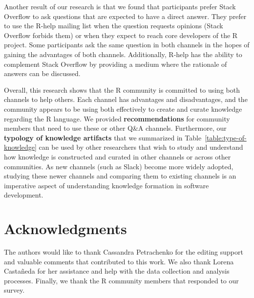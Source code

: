\documentclass[smallextended]{svjour3}       %
\newcommand{\SO}{Stack Overflow\xspace}
\newcommand{\RH}{R-help\xspace}
\begin{document}
Another result of our research is that we found that participants prefer \SO to ask questions that are expected to have a direct answer. They prefer to use the \RH mailing list when the
question requests opinions (\SO forbids them) or when they expect to reach core developers of the R project. Some participants ask the same question in both
channels in the hopes of gaining the advantages of both channels. Additionally, \RH has the ability to complement \SO by providing a medium where the rationale
of answers can be discussed.

Overall, this research shows that the R community is committed to using both channels to help others. Each channel has advantages and disadvantages, and the
community appears to be using both effectively to create and curate knowledge regarding the R language.  We provided \textbf{recommendations} for community members that need to use these or other Q\&A channels.  Furthermore, our \textbf{typology of knowledge artifacts} that we summarized in Table~\ref{table:type-of-knowledge} can be used by other researchers that wish to study and understand how knowledge is constructed and curated in other channels or across other communities.  As new channels (such as Slack) become more widely adopted, studying these newer channels and comparing them to existing channels is an imperative aspect of understanding knowledge formation in software development. 












 
\section{Acknowledgments}
The authors would like to thank Cassandra Petrachenko for the editing support and valuable comments that contributed to this work. We also thank Lorena Castañeda for her assistance and help with the data collection and analysis processes.  Finally, we thank the R community members that responded to our survey.



\end{document}
